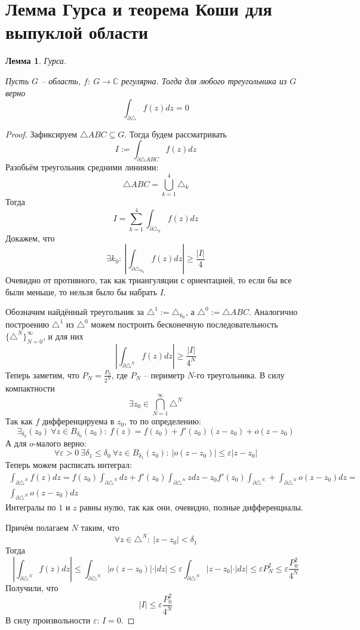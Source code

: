 \documentclass[a4paper,12pt]{article}
\renewcommand{\leq}{\ensuremath{\leqslant}}
\renewcommand{\geq}{\ensuremath{\geqslant}}
\theoremstyle{plain}
\newtheorem{lemma}{Лемма}[section]
\theoremstyle{definition}
\theoremstyle{remark}
\begin{document}
\section{Лемма Гурса и теорема Коши для выпуклой области}
\begin{lemma}
	Гурса.

	Пусть $G$ -- область, $f :\: G \to \mathbb{C}$ регулярна. Тогда для любого треугольника из $G$ верно
	\[
		\int_{\partial\triangle} f(z)dz = 0
	\]
\end{lemma}

\begin{proof}
	Зафиксируем $\triangle ABC \subseteq G$. Тогда будем рассматривать
	\[
		I := \int_{\partial\triangle ABC}f(z)dz
	\]
	Разобьём треугольник средними линиями:
	\[
		\triangle ABC = \bigcup_{k = 1}^4 \triangle_k
	\]
	Тогда
	\[
		I = \sum_{k = 1}^4 \int_{\partial \triangle_k}f(z)dz
	\]
	Докажем, что
	\[
		\exists k_0 :\: \left\vert \int_{\partial \triangle_{k_0}}f(z)dz\right\vert \geq \frac{\vert I\vert}{4}
	\]
	Очевидно от противного, так как триангуляции с ориентацией, то если бы все были меньше, то нельзя было бы набрать $I$.

	Обозначим найдённый треугольник за $\triangle^1 := \triangle_{k_0}$, а $\triangle^0 := \triangle ABC$. Аналогично построению $\triangle^1$ из $\triangle^0$ можем построить бесконечную последовательность $\{\triangle^N\}_{N = 0}^\infty$, и для них
	\[
		\left\vert \int_{\partial \triangle^N}f(z)dz\right\vert \geq \frac{\vert I\vert}{4^N}
	\]
	Теперь заметим, что $P_N = \frac{P_0}{2^N}$, где $P_N$ -- периметр $N$-го треугольника. В силу компактности
	\[
		\exists z_0 \in \bigcap_{N = 1}^\infty \triangle^N
	\]
	Так как $f$ дифференцируема в $z_0$, то по определению:
	\[
		\exists_{\delta_0}(z_0) \: \forall z \in B_{\delta_0}(z_0) :\: f(z) = f(z_0) + f'(z_0)(z - z_0) + o(z - z_0)
	\]
	А для $o$-малого верно:
	\[
		\forall \varepsilon > 0 \: \exists \delta_1 \leq \delta_0 \: \forall z \in B_{\delta_1}(z_0) :\: \vert o(z - z_0)\vert \leq \varepsilon\vert z - z_0\vert
	\]
	Теперь можем расписать интеграл:
	\begin{align*}
		\int_{\partial\triangle^N}f(z)dz = f(z_0)\int_{\partial\triangle^N}dz + f'(z_0)\int_{\partial\triangle^N}zdz - z_0f'(z_0)\int_{\partial\triangle^N} + \int_{\partial\triangle^N}o(z - z_0)dz = \\
		\int_{\partial\triangle^N}o(z - z_0)dz
	\end{align*}
	Интегралы по $1$ и $z$ равны нулю, так как они, очевидно, полные дифференциалы.

	Причём полагаем $N$ таким, что
	\[
		\forall z \in \triangle^N :\: \vert z - z_0\vert < \delta_1
	\]
	Тогда
	\[
		\left\vert\int_{\partial\triangle^N} f(z)dz\right\vert \leq \int_{\partial\triangle^N} \vert o(z - z_0)\vert\cdot\vert dz\vert \leq \varepsilon\int_{\partial\triangle^N} \vert z - z_0\vert\cdot\vert dz\vert \leq \varepsilon P_N^2 \leq \varepsilon\frac{P_0^2}{4^N}
	\]
	Получили, что
	\[
		\vert I\vert \leq \varepsilon\frac{P_0^2}{4^N}
	\]
	В силу произвольности $\varepsilon$: $I = 0$.
\end{proof}
\end{document}
